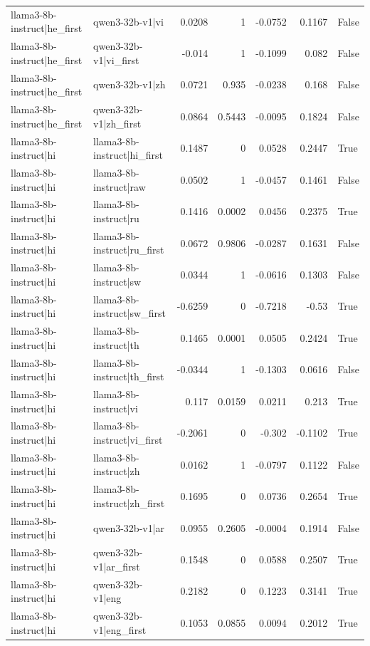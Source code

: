 \begin{table}
\begin{tabular}{l l r r r r l}
llama3-8b-instruct|he_first & qwen3-32b-v1|vi & 0.0208 & 1 & -0.0752 & 0.1167 & False \\
llama3-8b-instruct|he_first & qwen3-32b-v1|vi_first & -0.014 & 1 & -0.1099 & 0.082 & False \\
llama3-8b-instruct|he_first & qwen3-32b-v1|zh & 0.0721 & 0.935 & -0.0238 & 0.168 & False \\
llama3-8b-instruct|he_first & qwen3-32b-v1|zh_first & 0.0864 & 0.5443 & -0.0095 & 0.1824 & False \\
llama3-8b-instruct|hi & llama3-8b-instruct|hi_first & 0.1487 & 0 & 0.0528 & 0.2447 & True \\
llama3-8b-instruct|hi & llama3-8b-instruct|raw & 0.0502 & 1 & -0.0457 & 0.1461 & False \\
llama3-8b-instruct|hi & llama3-8b-instruct|ru & 0.1416 & 0.0002 & 0.0456 & 0.2375 & True \\
llama3-8b-instruct|hi & llama3-8b-instruct|ru_first & 0.0672 & 0.9806 & -0.0287 & 0.1631 & False \\
llama3-8b-instruct|hi & llama3-8b-instruct|sw & 0.0344 & 1 & -0.0616 & 0.1303 & False \\
llama3-8b-instruct|hi & llama3-8b-instruct|sw_first & -0.6259 & 0 & -0.7218 & -0.53 & True \\
llama3-8b-instruct|hi & llama3-8b-instruct|th & 0.1465 & 0.0001 & 0.0505 & 0.2424 & True \\
llama3-8b-instruct|hi & llama3-8b-instruct|th_first & -0.0344 & 1 & -0.1303 & 0.0616 & False \\
llama3-8b-instruct|hi & llama3-8b-instruct|vi & 0.117 & 0.0159 & 0.0211 & 0.213 & True \\
llama3-8b-instruct|hi & llama3-8b-instruct|vi_first & -0.2061 & 0 & -0.302 & -0.1102 & True \\
llama3-8b-instruct|hi & llama3-8b-instruct|zh & 0.0162 & 1 & -0.0797 & 0.1122 & False \\
llama3-8b-instruct|hi & llama3-8b-instruct|zh_first & 0.1695 & 0 & 0.0736 & 0.2654 & True \\
llama3-8b-instruct|hi & qwen3-32b-v1|ar & 0.0955 & 0.2605 & -0.0004 & 0.1914 & False \\
llama3-8b-instruct|hi & qwen3-32b-v1|ar_first & 0.1548 & 0 & 0.0588 & 0.2507 & True \\
llama3-8b-instruct|hi & qwen3-32b-v1|eng & 0.2182 & 0 & 0.1223 & 0.3141 & True \\
llama3-8b-instruct|hi & qwen3-32b-v1|eng_first & 0.1053 & 0.0855 & 0.0094 & 0.2012 & True \\

\end{tabular}
\end{table}
